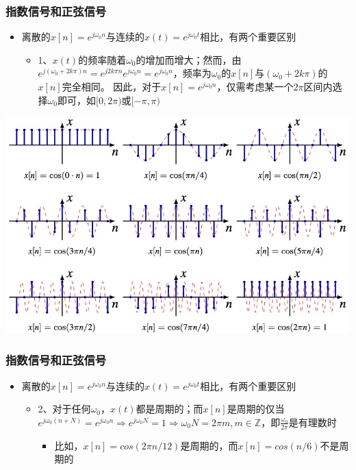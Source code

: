 \documentclass[CJKutf8,dvipsnames,table]{beamer}
\begin{document}
\begin{CJK*}{UTF8}{song}
  \begin{frame}
    \frametitle{指数信号和正弦信号}
    \begin{itemize}
    \item 离散的$x[n]=e^{j\omega_0 n}$与连续的$x(t)=e^{j\omega_{0}t}$相比，有两个重要区别
        \begin{itemize}
        \item 1、$x(t)$的频率随着$\omega_0$的增加而增大；然而，由$e^{j(\omega_0 + 2k\pi)n}=e^{j2k\pi n}e^{j\omega_0 n}=e^{j\omega_0 n}$，频率为$\omega_0$的$x[n]$与$(\omega_0 +2k\pi)$的$x[n]$完全相同。
        因此，对于$x[n]=e^{j\omega_0 n}$，仅需考虑某一个$2\pi$区间内选择$\omega_0$即可，如$[0, 2\pi)$或$[-\pi, \pi)$
        \end{itemize}    
    \end{itemize}
    \begin{center}
      \includegraphics[scale=.3]{dsinusoidp1}
    \end{center}  
  \end{frame} 

  \begin{frame}
    \frametitle{指数信号和正弦信号}
    \begin{itemize}
    \item 离散的$x[n]=e^{j\omega_0 n}$与连续的$x(t)=e^{j\omega_{0}t}$相比，有两个重要区别
        \begin{itemize}
        \item 2、对于任何$\omega_0$，$x(t)$都是周期的；而$x[n]$是周期的仅当$e^{j\omega_0 (n + N)}=e^{j\omega_0 n} \Rightarrow e^{j\omega_0 N}=1 \Rightarrow \omega_0 N=2\pi m, m \in \mathbb{Z}$，即$\frac{\omega_0}{2\pi}$是有理数时
		\begin{itemize}
		\item 比如，$x[n]=cos(2\pi n /12)$是周期的，而$x[n]=cos(n/6)$不是周期的
		\end{itemize}
        \end{itemize}    
    \end{itemize}
  \end{frame} 
    

\end{CJK*}
\end{document}
